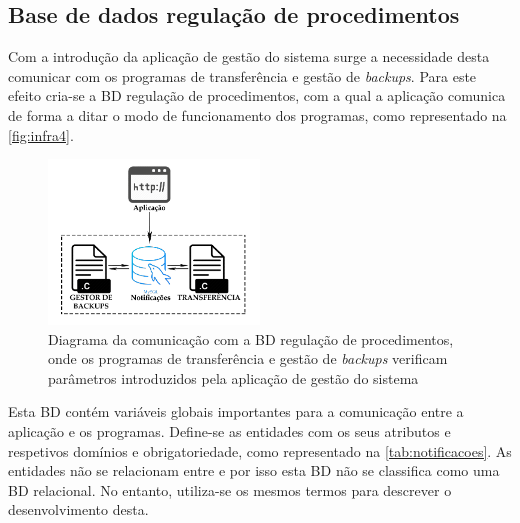 \documentclass[11pt,twoside,a4paper]{report}
\begin{document}
\subsection{Base de dados regulação de procedimentos}
\label{subchap:notificacoes}
Com a introdução da aplicação de gestão do sistema surge a necessidade desta comunicar com os programas de transferência e gestão de \textit{backups}. Para este efeito cria-se a BD regulação de procedimentos, com a qual a aplicação comunica de forma a ditar o modo de funcionamento dos programas, como representado na \autoref{fig:infra4}.
\begin{figure}[H]
	\centering
	\begin{center}
		\includegraphics[width=0.5\textwidth]{Aplicacao_notificacoes} %
		\caption[Diagrama da comunicação com a base de dados regulação de procedimentos]{Diagrama da comunicação com a BD regulação de procedimentos, onde os programas de transferência e gestão de \textit{backups} verificam parâmetros introduzidos pela aplicação de gestão do sistema}
		\label{fig:infra4}
	\end{center}
\end{figure}
Esta BD contém variáveis globais importantes para a comunicação entre a aplicação e os programas. Define-se as entidades com os seus atributos e respetivos domínios e obrigatoriedade, como representado na \autoref{tab:notificacoes}. As entidades não se relacionam entre e por isso esta BD não se classifica como uma BD relacional. No entanto, utiliza-se os mesmos termos para descrever o desenvolvimento desta.
\end{document}
